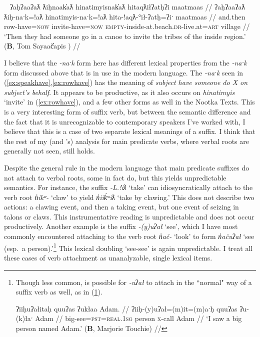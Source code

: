 \ex~ \label{ex:rowhave}
\begingl
\glpreamble ʔaḥʔaaʔaƛ ƛiḥnaak̓aƛ hinatimyisnak̓aƛ hitaqƛiłʔatḥʔi maatmaas //
\gla ʔaḥʔaaʔaƛ ƛiḥ-naˑk=!aƛ hinatimyis-naˑk=!aƛ hita-!aqƛ-°ił-ʔatḥ=ʔiˑ maatmaas //
\glb and.then row-have=\textsc{now} invite-have=\textsc{now} \textsc{empty}-inside-at.beach.\textsc{dr}-live.at=\textsc{art} village //
\glft `Then they had someone go in a canoe to invite the tribes of the inside region.' (\textbf{B}, Tom Sayaač̓apis \citealt[297--298]{sapir1955}) //
\endgl
\xe

I believe that the \textit{-naˑk} form here has different lexical properties from the \textit{-naˑk} form discussed above that is in use in the modern language. The \textit{-naˑk} seen in (\ref{ex:speakhave},\ref{ex:rowhave}) has the meaning of \textit{subject have someone do X on subject's behalf}. It appears to be productive, as it also occurs on \textit{hinatimyis} `invite' in (\ref{ex:rowhave}), and a few other forms as well in the Nootka Texts. This is a very interesting form of suffix verb, but between the semantic difference and the fact that it is unrecognizable to contemporary speakers I've worked with, I believe that this is a case of two separate lexical meanings of a suffix. I think that the rest of my (and \citeauthor{wojdak2005}'s) analysis for main predicate verbs, where verbal roots are generally not seen, still holds.

Despite the general rule in the modern language that main predicate suffixes do not attach to verbal roots, some in fact do, but this yields unpredictable semantics. For instance, the suffix \textit{-L.!iƛ} `take' can idiosyncratically attach to the verb root \textit{n̓ikʷ-} `claw' to yield \textit{n̓iik̓ʷiƛ} `take by clawing.' This does not describe two actions: a clawing event, and then a taking event, but one event of seizing in talons or claws. This instrumentative reading is unpredictable and does not occur productively. Another example is the suffix \textit{-(y)uʔał} `see', which I have most commonly encountered attaching to the verb root \textit{n̓ač-} `look' to form \textit{n̓ačuʔał} `see (esp.\ a person).'\footnote{Though less common, is possible for \textit{-uʔał} to attach in the ``normal" way of a suffix verb as well, as in (\ref{ex:sawabigman}).

\ex \label{ex:sawabigman}
\begingl
\glpreamble ʔiiḥuʔałitaḥ quuʔas ʔukłaa Adam. //
\gla ʔiiḥ-(y)uʔał=(m)it=(m)aˑḥ quuʔas ʔu-(k)łaˑ Adam //
\glb big-see=\textsc{pst}=\textsc{real.1sg} person \textsc{x}-call Adam //
\glft `I saw a big person named Adam.' (\textbf{B}, Marjorie Touchie) //
\endgl
\xe
} This lexical doubling `see-see' is again unpredictable. I treat all these cases of verb attachment as unanalyzable, single lexical items.

